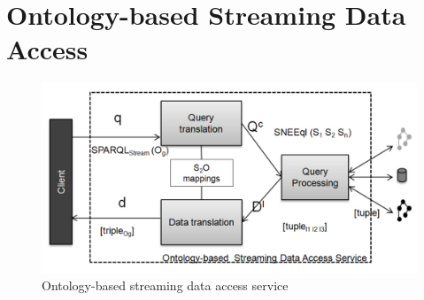 \section{Ontology-based Streaming Data Access}
\label{approach}



\begin{figure}[t]
  \centering
  \includegraphics[width=1\textwidth]{img/approachImg}
  \caption{Ontology-based streaming data access service}
  \label{fig:SemanticIntegrator}
\end{figure}

